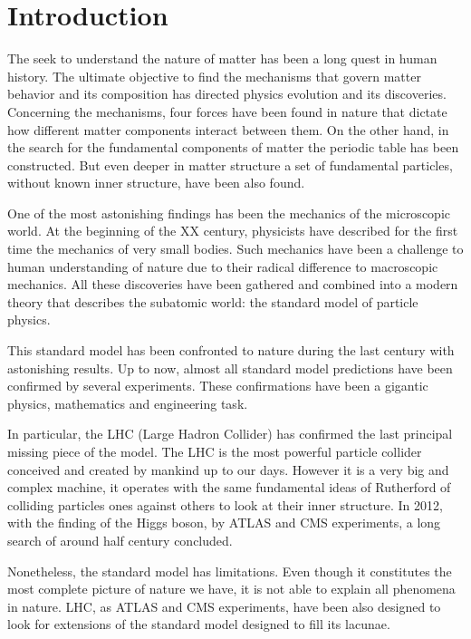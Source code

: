 \chapter*{Introduction}

The seek to understand the nature of matter has been a long quest in human history. The ultimate objective to find the mechanisms that govern matter behavior and its composition has directed physics evolution and its discoveries. Concerning the mechanisms, four forces have been found in nature that dictate how different matter components interact between them. On the other hand, in the search for the fundamental components of matter the periodic table has been constructed. But even deeper in matter structure a set of fundamental particles, without known inner structure, have been also found. 

One of the most astonishing findings has been the mechanics of the microscopic world. At the beginning of the XX century, physicists have described for the first time the mechanics of very small bodies. Such mechanics have been a challenge to human understanding of nature due to their radical difference to macroscopic mechanics. All these discoveries have been gathered and combined into a modern theory that describes the subatomic world: the standard model of particle physics. 

This standard model has been confronted to nature during the last century with astonishing results. Up to now, almost all standard model predictions have been confirmed by several experiments. These confirmations have been a gigantic physics, mathematics and engineering task.

In particular, the LHC (Large Hadron Collider) has confirmed the last principal missing piece of the model. The LHC is the most powerful particle collider conceived and created by mankind up to our days. However it is a very big and complex machine, it operates with the same fundamental ideas of Rutherford of colliding particles ones against others to look at their inner structure. In 2012, with the finding of the Higgs boson, by ATLAS and CMS experiments, a long search of around half century concluded.

Nonetheless, the standard model has limitations. Even though it constitutes the most complete picture of nature we have, it is not able to explain all phenomena in nature. LHC, as ATLAS and CMS experiments, have been also designed to look for extensions of the standard model designed to fill its lacunae. 

